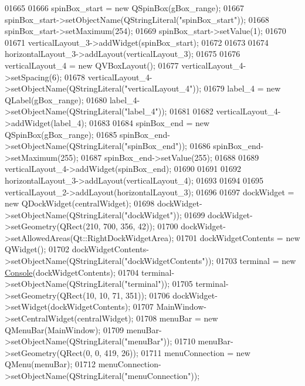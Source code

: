 \begin{DoxyCode}
01665 
01666         spinBox\_start = \textcolor{keyword}{new} QSpinBox(gBox\_range);
01667         spinBox\_start->setObjectName(QStringLiteral(\textcolor{stringliteral}{"spinBox\_start"}));
01668         spinBox\_start->setMaximum(254);
01669         spinBox\_start->setValue(1);
01670 
01671         verticalLayout\_3->addWidget(spinBox\_start);
01672 
01673 
01674         horizontalLayout\_3->addLayout(verticalLayout\_3);
01675 
01676         verticalLayout\_4 = \textcolor{keyword}{new} QVBoxLayout();
01677         verticalLayout\_4->setSpacing(6);
01678         verticalLayout\_4->setObjectName(QStringLiteral(\textcolor{stringliteral}{"verticalLayout\_4"}));
01679         label\_4 = \textcolor{keyword}{new} QLabel(gBox\_range);
01680         label\_4->setObjectName(QStringLiteral(\textcolor{stringliteral}{"label\_4"}));
01681 
01682         verticalLayout\_4->addWidget(label\_4);
01683 
01684         spinBox\_end = \textcolor{keyword}{new} QSpinBox(gBox\_range);
01685         spinBox\_end->setObjectName(QStringLiteral(\textcolor{stringliteral}{"spinBox\_end"}));
01686         spinBox\_end->setMaximum(255);
01687         spinBox\_end->setValue(255);
01688 
01689         verticalLayout\_4->addWidget(spinBox\_end);
01690 
01691 
01692         horizontalLayout\_3->addLayout(verticalLayout\_4);
01693 
01694 
01695         verticalLayout\_2->addLayout(horizontalLayout\_3);
01696 
01697         dockWidget = \textcolor{keyword}{new} QDockWidget(centralWidget);
01698         dockWidget->setObjectName(QStringLiteral(\textcolor{stringliteral}{"dockWidget"}));
01699         dockWidget->setGeometry(QRect(210, 700, 356, 42));
01700         dockWidget->setAllowedAreas(Qt::RightDockWidgetArea);
01701         dockWidgetContents = \textcolor{keyword}{new} QWidget();
01702         dockWidgetContents->setObjectName(QStringLiteral(\textcolor{stringliteral}{"dockWidgetContents"}));
01703         terminal = \textcolor{keyword}{new} \hyperlink{a00005}{Console}(dockWidgetContents);
01704         terminal->setObjectName(QStringLiteral(\textcolor{stringliteral}{"terminal"}));
01705         terminal->setGeometry(QRect(10, 10, 71, 351));
01706         dockWidget->setWidget(dockWidgetContents);
01707         MainWindow->setCentralWidget(centralWidget);
01708         menuBar = \textcolor{keyword}{new} QMenuBar(MainWindow);
01709         menuBar->setObjectName(QStringLiteral(\textcolor{stringliteral}{"menuBar"}));
01710         menuBar->setGeometry(QRect(0, 0, 419, 26));
01711         menuConnection = \textcolor{keyword}{new} QMenu(menuBar);
01712         menuConnection->setObjectName(QStringLiteral(\textcolor{stringliteral}{"menuConnection"}));

\end{DoxyCode}

